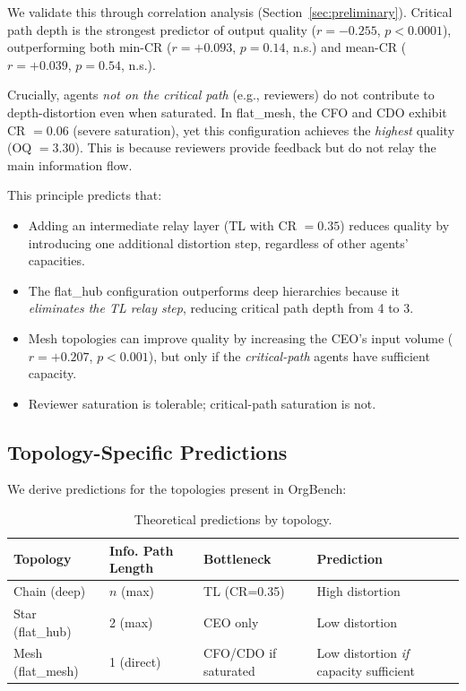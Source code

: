 \documentclass[conference]{IEEEtran}
\begin{document}
We validate this through correlation analysis (Section~\ref{sec:preliminary}).
Critical path depth is the strongest predictor of output quality ($r = -0.255$, $p < 0.0001$), outperforming both min-CR ($r = +0.093$, $p = 0.14$, n.s.) and mean-CR ($r = +0.039$, $p = 0.54$, n.s.).

Crucially, agents \emph{not on the critical path} (e.g., reviewers) do not contribute to depth-distortion even when saturated.
In flat\_mesh, the CFO and CDO exhibit CR $= 0.06$ (severe saturation), yet this configuration achieves the \emph{highest} quality (OQ $= 3.30$).
This is because reviewers provide feedback but do not relay the main information flow.

This principle predicts that:
\begin{itemize}
    \item Adding an intermediate relay layer (TL with CR $= 0.35$) reduces quality by introducing one additional distortion step, regardless of other agents' capacities.
    \item The flat\_hub configuration outperforms deep hierarchies because it \emph{eliminates the TL relay step}, reducing critical path depth from 4 to 3.
    \item Mesh topologies can improve quality by increasing the CEO's input volume ($r = +0.207$, $p < 0.001$), but only if the \emph{critical-path} agents have sufficient capacity.
    \item Reviewer saturation is tolerable; critical-path saturation is not.
\end{itemize}

\subsection{Topology-Specific Predictions}
\label{subsec:predictions}

We derive predictions for the topologies present in OrgBench:

\begin{table}[t]
\centering
\caption{Theoretical predictions by topology.}
\label{tab:predictions}
\small
\begin{tabular}{p{1.5cm}p{2.2cm}p{1.5cm}p{2cm}}
\toprule
\textbf{Topology} & \textbf{Info. Path Length} & \textbf{Bottleneck} & \textbf{Prediction} \\
\midrule
Chain (deep) & $n$ (max) & TL (CR=0.35) & High distortion \\
Star (flat\_hub) & 2 (max) & CEO only & Low distortion \\
Mesh (flat\_mesh) & 1 (direct) & CFO/CDO if saturated & Low distortion \emph{if} capacity sufficient \\
\bottomrule
\end{tabular}
\end{table}
\end{document}
